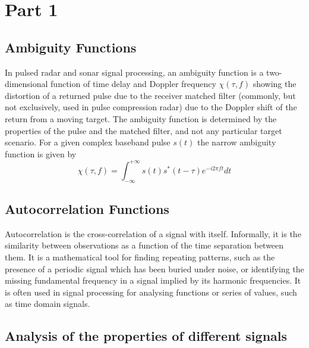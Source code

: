 \documentclass{article}
\begin{document}

\section{Part 1}
\label{sec:part1}
\subsection{Ambiguity Functions}

In pulsed radar and sonar signal processing, an ambiguity function is a two-dimensional function of time delay and Doppler frequency $\chi(\tau,f)$ showing the distortion of a returned pulse due to the receiver matched filter (commonly, but not exclusively, used in pulse compression radar) due to the Doppler shift of the return from a moving target. The ambiguity function is determined by the properties of the pulse and the matched filter, and not any particular target scenario. For a given complex baseband pulse $s(t)$ the narrow ambiguity function is given by \cite{Wiki:2012ambi} $$\chi(\tau,f)= \int_{-\infty}^{+\infty} s(t) s^{*}(t-\tau) e^{-i2 \pi ft} dt$$

\subsection{Autocorrelation Functions}
Autocorrelation is the cross-correlation of a signal with itself. Informally, it is the similarity between observations as a function of the time separation between them. It is a mathematical tool for finding repeating patterns, such as the presence of a periodic signal which has been buried under noise, or identifying the missing fundamental frequency in a signal implied by its harmonic frequencies. It is often used in signal processing for analysing functions or series of values, such as time domain signals. \cite{Wiki:2012auto}

\subsection{Analysis of the properties of different signals}
\end{document}
